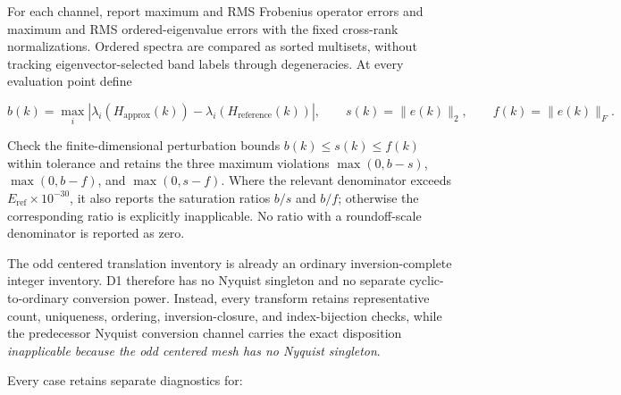 \documentclass[11pt]{article}
\begin{document}
For each channel, report maximum and RMS Frobenius operator errors and maximum and RMS
ordered-eigenvalue errors with the fixed cross-rank normalizations. Ordered spectra are
compared as sorted multisets, without tracking eigenvector-selected band labels through
degeneracies. At every evaluation point define

\begin{equation}
 b(k)=\max_i\left|\lambda_i(H_{\mathrm{approx}}(k))
 -\lambda_i(H_{\mathrm{reference}}(k))\right|,
 \qquad
 s(k)=\lVert e(k)\rVert_2,
 \qquad
 f(k)=\lVert e(k)\rVert_F.
 \label{eq:diagnostic-perturbation-bounds}
\end{equation}

Check the finite-dimensional perturbation bounds
$b(k)\leq s(k)\leq f(k)$ within tolerance and retains the three maximum violations
$\max(0,b-s)$, $\max(0,b-f)$, and $\max(0,s-f)$. Where the relevant denominator exceeds
$E_{\mathrm{ref}}\times10^{-30}$, it also reports the
saturation ratios $b/s$ and $b/f$; otherwise the corresponding ratio is explicitly
inapplicable. No ratio with a roundoff-scale denominator is reported as zero.

The odd centered translation inventory is already an ordinary inversion-complete integer
inventory. D1 therefore has no Nyquist singleton and no separate cyclic-to-ordinary
conversion power. Instead, every transform retains representative count, uniqueness,
ordering, inversion-closure, and index-bijection checks, while the predecessor Nyquist
conversion channel carries the exact disposition
\emph{inapplicable because the odd centered mesh has no Nyquist singleton}.

Every case retains separate diagnostics for:
\end{document}
